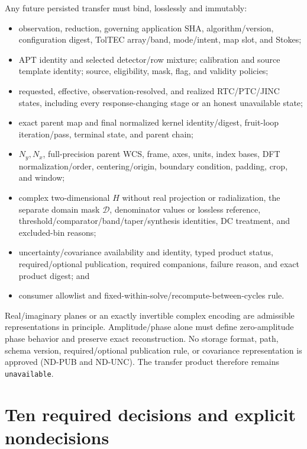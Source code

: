 \documentclass[11pt]{article}
\newcommand{\NA}{\texttt{unavailable}}
\begin{document}
Any future persisted transfer must bind, losslessly and immutably:
\begin{itemize}
\item observation, reduction, governing application SHA, algorithm/version,
configuration digest, TolTEC array/band, mode/intent, map slot, and Stokes;
\item APT identity and selected detector/row mixture; calibration and source
template identity; source, eligibility, mask, flag, and validity policies;
\item requested, effective, observation-resolved, and realized RTC/PTC/JINC
states, including every response-changing stage or an honest unavailable
state;
\item exact parent map and final normalized kernel identity/digest, fruit-loop
iteration/pass, terminal state, and parent chain;
\item $N_y,N_x$, full-precision parent WCS, frame, axes, units, index bases,
DFT normalization/order, centering/origin, boundary condition, padding, crop,
and window;
\item complex two-dimensional $H$ without real projection or radialization,
the separate domain mask $\mathcal D$, denominator values or lossless
reference, threshold/comparator/band/taper/synthesis identities, DC treatment,
and excluded-bin reasons;
\item uncertainty/covariance availability and identity, typed product status,
required/optional publication, required companions, failure reason, and exact
product digest; and
\item consumer allowlist and fixed-within-solve/recompute-between-cycles rule.
\end{itemize}

Real/imaginary planes or an exactly invertible complex encoding are admissible
representations in principle.  Amplitude/phase alone must define zero-amplitude
phase behavior and preserve exact reconstruction.  No storage format, path,
schema version, required/optional publication rule, or covariance
representation is approved (ND-PUB and ND-UNC).  The transfer product therefore
remains \NA.

\section{Ten required decisions and explicit nondecisions}
\end{document}
